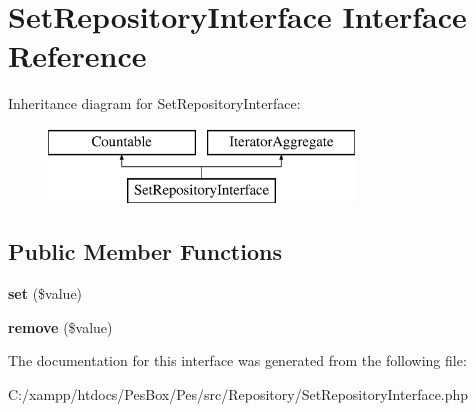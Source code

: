 \hypertarget{interface_pes_1_1_repository_1_1_set_repository_interface}{}\section{Set\+Repository\+Interface Interface Reference}
\label{interface_pes_1_1_repository_1_1_set_repository_interface}
Inheritance diagram for Set\+Repository\+Interface\+:\begin{figure}[H]
\begin{center}
\leavevmode
\includegraphics[height=2.000000cm]{interface_pes_1_1_repository_1_1_set_repository_interface}
\end{center}
\end{figure}
\subsection*{Public Member Functions}
\begin{DoxyCompactItemize}
\item 
\mbox{\label{interface_pes_1_1_repository_1_1_set_repository_interface_a4cb9716a3dead296474d25838294ed39}} 
{\bfseries set} (\$value)
\item 
\mbox{\label{interface_pes_1_1_repository_1_1_set_repository_interface_a09f38fcbfea946567deee69c5762c93d}} 
{\bfseries remove} (\$value)
\end{DoxyCompactItemize}


The documentation for this interface was generated from the following file\+:\begin{DoxyCompactItemize}
\item 
C\+:/xampp/htdocs/\+Pes\+Box/\+Pes/src/\+Repository/Set\+Repository\+Interface.\+php\end{DoxyCompactItemize}
